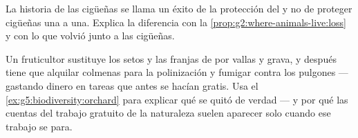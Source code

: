 \begin{exercise}[$\star\star$]\label{exo:g5:biodiversity:10}
La historia de las cigüeñas se llama un éxito de la protección del
\emph{} y no de proteger cigüeñas una a una. Explica la
diferencia con la \cref{prop:g2:where-animals-live:loss} y con lo que
volvió junto a las cigüeñas.
\end{exercise}

\begin{exercise}[$\star\star\star$]\label{exo:g5:biodiversity:11}
Un fruticultor sustituye los setos y las franjas de  por vallas
y grava, y después tiene que alquilar colmenas para la polinización y
fumigar contra los pulgones --- gastando dinero en tareas que antes se
hacían gratis. Usa el \cref{ex:g5:biodiversity:orchard} para explicar
qué se quitó de verdad --- y por qué las cuentas del trabajo gratuito
de la naturaleza suelen aparecer solo cuando ese trabajo se para.
\end{exercise}
